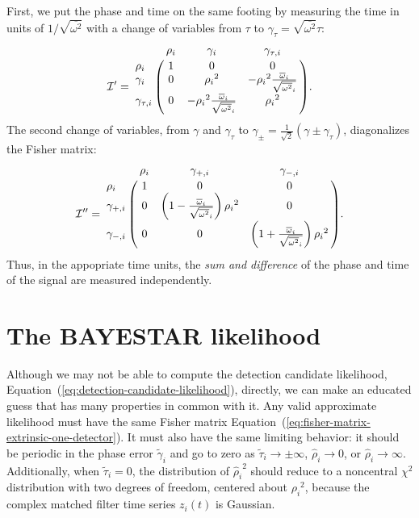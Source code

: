 \documentclass[amsmath,amssymb,aps,prx,reprint,nopreprintnumbers,nofootinbib]{revtex4-1}
\begin{document}
First, we put the phase and time on the same footing by measuring the time in units of $1 / \sqrt{\overline{\omega^2}}$ with a change of variables from $\tau$ to $\gamma_\tau = \sqrt{\overline{\omega^2}} \tau$:
%
\begin{equation}
    \mathcal{I}' = \bordermatrix{
        ~ & \rho_i & \gamma_i & \gamma_{\tau,i} \cr
        \rho_i & 1 & 0 & 0 \cr
        \gamma_i & 0 & {\rho_i}^2 & -{\rho_i}^2\frac{{\overline{\omega}}_i}{\sqrt{{\overline{\omega^2}}_i}} \cr
        \gamma_{\tau,i} & 0 & -{\rho_i}^2\frac{{\overline{\omega}}_i}{\sqrt{{\overline{\omega^2}}_i}} & {\rho_i}^2
    }.
\end{equation}
%
The second change of variables, from $\gamma$ and $\gamma_\tau$ to $\gamma_\pm = \frac{1}{\sqrt{2}}(\gamma \pm \gamma_\tau)$, diagonalizes the Fisher matrix:
%
\begin{equation}\label{eq:fisher-matrix-extrinsic-one-detector}
    \mathcal{I}'' = \bordermatrix{
        ~ & \rho_i & \gamma_{+,i} & \gamma_{-,i} \cr
        \rho_i & 1 & 0 & 0 \cr
        \gamma_{+,i} & 0 & \left(1 - \frac{\overline{\omega}_i}{\sqrt{\overline{\omega^2}_i}}\right){\rho_i}^2 & 0 \cr
        \gamma_{-,i} & 0 & 0 & \left(1 + \frac{\overline{\omega}_i}{\sqrt{\overline{\omega^2}_i}}\right){\rho_i}^2
    }.
\end{equation}
%
Thus, in the appopriate time units, the \textit{sum and difference} of the phase and time of the signal are measured independently.

\section{The \ac{BAYESTAR} likelihood}

Although we may not be able to compute the detection candidate likelihood, Equation~(\ref{eq:detection-candidate-likelihood}), directly, we can make an educated guess that has many properties in common with it. Any valid approximate likelihood must have the same Fisher matrix Equation~(\ref{eq:fisher-matrix-extrinsic-one-detector}). It must also have the same limiting behavior: it should be periodic in the phase error $\tilde{\gamma}_i$ and go to zero as $\tilde{\tau}_i \rightarrow \pm \infty$, $\hat{\rho}_i \rightarrow 0$, or $\hat{\rho}_i \rightarrow \infty$. Additionally, when $\tilde{\tau}_i = 0$, the distribution of ${\hat{\rho}_i}^2$ should reduce to a noncentral $\chi^2$ distribution with two degrees of freedom, centered about ${\rho_i}^2$, because the complex matched filter time series $z_i(t)$ is Gaussian.
\end{document}
